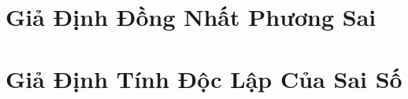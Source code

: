 \documentclass[12pt, a4paper]{article}
\begin{document}







\section{Giả Định Đồng Nhất Phương Sai}







\section{Giả Định Tính Độc Lập Của Sai Số}





\newpage
\renewcommand{\refname}{Tài liệu tham khảo}


\end{document}
